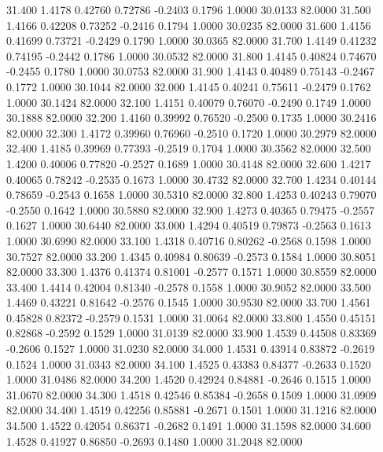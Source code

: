   31.400   1.4178   0.42760   0.72786  -0.2403   0.1796   1.0000  30.0133  82.0000
  31.500   1.4166   0.42208   0.73252  -0.2416   0.1794   1.0000  30.0235  82.0000
  31.600   1.4156   0.41699   0.73721  -0.2429   0.1790   1.0000  30.0365  82.0000
  31.700   1.4149   0.41232   0.74195  -0.2442   0.1786   1.0000  30.0532  82.0000
  31.800   1.4145   0.40824   0.74670  -0.2455   0.1780   1.0000  30.0753  82.0000
  31.900   1.4143   0.40489   0.75143  -0.2467   0.1772   1.0000  30.1044  82.0000
  32.000   1.4145   0.40241   0.75611  -0.2479   0.1762   1.0000  30.1424  82.0000
  32.100   1.4151   0.40079   0.76070  -0.2490   0.1749   1.0000  30.1888  82.0000
  32.200   1.4160   0.39992   0.76520  -0.2500   0.1735   1.0000  30.2416  82.0000
  32.300   1.4172   0.39960   0.76960  -0.2510   0.1720   1.0000  30.2979  82.0000
  32.400   1.4185   0.39969   0.77393  -0.2519   0.1704   1.0000  30.3562  82.0000
  32.500   1.4200   0.40006   0.77820  -0.2527   0.1689   1.0000  30.4148  82.0000
  32.600   1.4217   0.40065   0.78242  -0.2535   0.1673   1.0000  30.4732  82.0000
  32.700   1.4234   0.40144   0.78659  -0.2543   0.1658   1.0000  30.5310  82.0000
  32.800   1.4253   0.40243   0.79070  -0.2550   0.1642   1.0000  30.5880  82.0000
  32.900   1.4273   0.40365   0.79475  -0.2557   0.1627   1.0000  30.6440  82.0000
  33.000   1.4294   0.40519   0.79873  -0.2563   0.1613   1.0000  30.6990  82.0000
  33.100   1.4318   0.40716   0.80262  -0.2568   0.1598   1.0000  30.7527  82.0000
  33.200   1.4345   0.40984   0.80639  -0.2573   0.1584   1.0000  30.8051  82.0000
  33.300   1.4376   0.41374   0.81001  -0.2577   0.1571   1.0000  30.8559  82.0000
  33.400   1.4414   0.42004   0.81340  -0.2578   0.1558   1.0000  30.9052  82.0000
  33.500   1.4469   0.43221   0.81642  -0.2576   0.1545   1.0000  30.9530  82.0000
  33.700   1.4561   0.45828   0.82372  -0.2579   0.1531   1.0000  31.0064  82.0000
  33.800   1.4550   0.45151   0.82868  -0.2592   0.1529   1.0000  31.0139  82.0000
  33.900   1.4539   0.44508   0.83369  -0.2606   0.1527   1.0000  31.0230  82.0000
  34.000   1.4531   0.43914   0.83872  -0.2619   0.1524   1.0000  31.0343  82.0000
  34.100   1.4525   0.43383   0.84377  -0.2633   0.1520   1.0000  31.0486  82.0000
  34.200   1.4520   0.42924   0.84881  -0.2646   0.1515   1.0000  31.0670  82.0000
  34.300   1.4518   0.42546   0.85384  -0.2658   0.1509   1.0000  31.0909  82.0000
  34.400   1.4519   0.42256   0.85881  -0.2671   0.1501   1.0000  31.1216  82.0000
  34.500   1.4522   0.42054   0.86371  -0.2682   0.1491   1.0000  31.1598  82.0000
  34.600   1.4528   0.41927   0.86850  -0.2693   0.1480   1.0000  31.2048  82.0000
